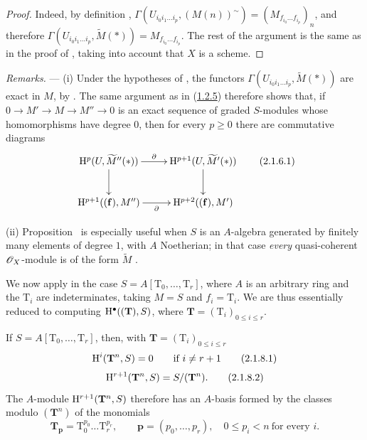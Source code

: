 \begin{proof}
Indeed, by definition , $\Gamma(U_{i_0i_1\ldots i_p},(M(n))^\sim)
=(M_{f_{i_0}\ldots f_{i_p}})_n$,
and therefore $\Gamma(U_{i_0i_1\ldots i_p},\widetilde{M}(*))=M_{f_{i_0}\ldots f_{i_p}}$.
The rest of the argument is the same as in the proof of , taking into account that $X$ is a scheme.
\end{proof}

\begin{env}[2.1.6]
\label{III.2.1.6}
\emph{Remarks.} ---
(i) Under the hypotheses of , the functors $\Gamma(U_{i_0i_1\ldots i_p},\widetilde{M}(*))$ are exact in $M$, by .
The same argument as in (\hyperref[III.1.2.5]{1.2.5}) therefore shows that, if $0\to M'\to M\to M''\to0$ is an exact sequence of graded $S$-modules whose homomorphisms have degree $0$, then for every $p\geq0$ there are commutative diagrams
\[
\label{III.2.1.6.1}
  \xymatrix{
    \HH^p(U,\widetilde M''(*)) \ar[r]^-\partial \ar[d] &
    \HH^{p+1}(U,\widetilde M'(*)) \ar[d] \\
    \HH^{p+1}((\mathbf{f}),M'') \ar[r]_-\partial &
    \HH^{p+2}((\mathbf{f}),M')
  }
  \tag{2.1.6.1}
\]

(ii) Proposition~ is especially useful when $S$ is an $A$-algebra generated by finitely many elements of degree $1$, with $A$ Noetherian; in that case \emph{every} quasi-coherent $\mathscr{O}_X$-module is of the form $\widetilde{M}$ .
\end{env}

\begin{env}[2.1.7]
\label{III.2.1.7}
We now apply  in the case $S=A[\mathrm{T}_0,\dots,\mathrm{T}_r]$, where $A$ is an arbitrary ring and the $\mathrm{T}_i$ are indeterminates, taking $M=S$ and $f_i=\mathrm{T}_i$.
We are thus essentially reduced to computing $\mathrm{H}^\bullet((\mathbf{T}),S)$, where $\mathbf{T}=(\mathrm{T}_i)_{0\leq i\leq r}$.
\end{env}

\begin{lemma}[2.1.8]
\label{III.2.1.8}
If $S=A[\mathrm{T}_0,\dots,\mathrm{T}_r]$, then, with $\mathbf{T}=(\mathrm{T}_i)_{0\leq i\leq r}$
\[
\label{III.2.1.8.1}
  \mathrm{H}^i(\mathbf{T}^n,S)=0
  \qquad\text{if }i\neq r+1
  \tag{2.1.8.1}
\]
\[
\label{III.2.1.8.2}
  \mathrm{H}^{r+1}(\mathbf{T}^n,S)=S/(\mathbf{T}^n).
  \tag{2.1.8.2}
\]
The $A$-module $\mathrm{H}^{r+1}(\mathbf{T}^n,S)$ therefore has an $A$-basis formed by the classes modulo $(\mathbf{T}^n)$ of the monomials
\[
  \mathbf{T}_{\mathbf{p}}=\mathrm{T}_0^{p_0}\ldots\mathrm{T}_r^{p_r},
  \qquad \mathbf{p}=(p_0,\dots,p_r),\quad 0\leq p_i<n\ \text{for every }i.
\]
\end{lemma}

